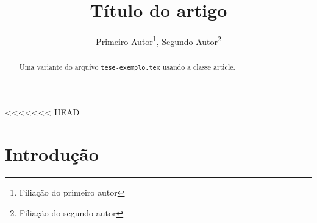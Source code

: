 <<<<<<< HEAD

\title{Título do artigo}
\author{Primeiro Autor\thanks{Filiação do primeiro autor}, Segundo Autor\thanks{Filiação do segundo autor}}



\date{}



\maketitle

\begin{abstract}
  Uma variante do arquivo \texttt{tese-exemplo.tex} usando a classe
  \textsf{article}.
\end{abstract}

\section{Introdução}

